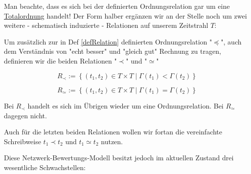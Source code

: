 \vspace{1cm}

Man beachte, dass es sich bei der definierten Ordnungsrelation gar um eine \href{https://de.wikipedia.org/wiki/Ordnungsrelation#Totalordnung}{Totalordnung} handelt!
Der Form halber ergänzen wir an der Stelle noch um zwei weitere - schematisch induzierte - Relationen auf unserem Zeitstrahl $T$:

\vspace{0.3cm}

\begin{Def}\label{defRelationen}

Um zusätzlich zur in Def \ref{defRelation} definierten Ordnungsrelation "$\preceq$", auch dem Verständnis von "echt besser" und "gleich gut" Rechnung zu tragen, definieren wir die beiden Relationen "$\prec$" und "$\simeq$"

\vspace{0.3cm}

\begin{equation*}
  R_{\prec}:= \left\{ (t_1, t_2) \in T \times T \mid \Gamma(t_1) < \Gamma(t_2) \right\}
\end{equation*}

\begin{equation*}
  R_{\simeq}:= \left\{ (t_1, t_2) \in T \times T \mid \Gamma(t_1) = \Gamma(t_2) \right\}
\end{equation*}

\vspace{1cm}

Bei $R_{\prec}$ handelt es sich im Übrigen wieder um eine Ordnungsrelation. Bei $R_{\simeq}$ dagegen nicht.

\end{Def}

\vspace{0.3cm}

Auch für die letzten beiden Relationen wollen wir fortan die vereinfachte Schreibweise $t_1 \prec t_2$ und $t_1 \simeq t_2$ nutzen. 

\vspace{1cm}

Diese Netzwerk-Bewertungs-Modell besitzt jedoch im aktuellen Zustand drei wesentliche Schwachstellen:

